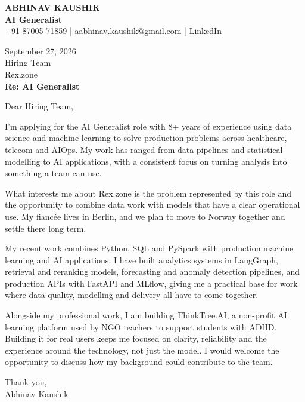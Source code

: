 \documentclass[10pt,a4paper]{article}
\begin{document}
\begin{center}
{\Large\bfseries ABHINAV KAUSHIK}\\[2pt]
{\bfseries AI Generalist}\\[2pt]
+91 87005 71859 \quad | \quad aabhinav.kaushik@gmail.com \quad | \quad LinkedIn
\end{center}
\vspace{8pt}
September 27, 2026\\[6pt]
Hiring Team\\
Rex.zone\\[4pt]
\textbf{Re: AI Generalist}

Dear Hiring Team,

I’m applying for the AI Generalist role with 8+ years of experience using data science and machine learning to solve production problems across healthcare, telecom and AIOps. My work has ranged from data pipelines and statistical modelling to AI applications, with a consistent focus on turning analysis into something a team can use.

What interests me about Rex.zone is the problem represented by this role and the opportunity to combine data work with models that have a clear operational use. My fiancée lives in Berlin, and we plan to move to Norway together and settle there long term.

My recent work combines Python, SQL and PySpark with production machine learning and AI applications. I have built analytics systems in LangGraph, retrieval and reranking models, forecasting and anomaly detection pipelines, and production APIs with FastAPI and MLflow, giving me a practical base for work where data quality, modelling and delivery all have to come together.

Alongside my professional work, I am building ThinkTree.AI, a non-profit AI learning platform used by NGO teachers to support students with ADHD. Building it for real users keeps me focused on clarity, reliability and the experience around the technology, not just the model. I would welcome the opportunity to discuss how my background could contribute to the team.

Thank you,\\
Abhinav Kaushik
\end{document}
